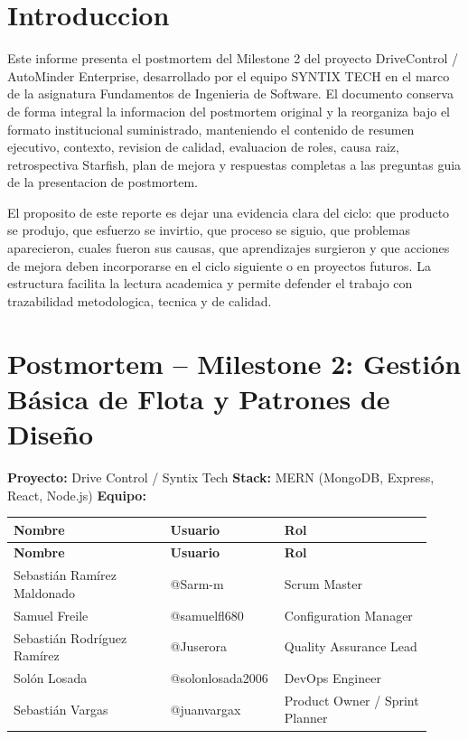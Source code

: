 \documentclass[11pt,a4paper]{article}
\begin{document}
\clearpage
{}
\tableofcontents
\clearpage

\clearpage
\section{Introduccion}

Este informe presenta el postmortem del Milestone 2 del proyecto DriveControl / AutoMinder Enterprise, desarrollado por el equipo SYNTIX TECH en el marco de la asignatura Fundamentos de Ingenieria de Software. El documento conserva de forma integral la informacion del postmortem original y la reorganiza bajo el formato institucional suministrado, manteniendo el contenido de resumen ejecutivo, contexto, revision de calidad, evaluacion de roles, causa raiz, retrospectiva Starfish, plan de mejora y respuestas completas a las preguntas guia de la presentacion de postmortem.

El proposito de este reporte es dejar una evidencia clara del ciclo: que producto se produjo, que esfuerzo se invirtio, que proceso se siguio, que problemas aparecieron, cuales fueron sus causas, que aprendizajes surgieron y que acciones de mejora deben incorporarse en el ciclo siguiente o en proyectos futuros. La estructura facilita la lectura academica y permite defender el trabajo con trazabilidad metodologica, tecnica y de calidad.

\clearpage
\section{Postmortem -- Milestone 2: Gestión Básica de Flota y Patrones de Diseño}
\textbf{Proyecto:} Drive Control / Syntix Tech
\textbf{Stack:} MERN (MongoDB, Express, React, Node.js)
\textbf{Equipo:}

\begingroup
\scriptsize
\setlength{\tabcolsep}{3pt}
\begin{longtable}{P{0.36\linewidth}P{0.22\linewidth}P{0.34\linewidth}}
\toprule
\textbf{Nombre} & \textbf{Usuario} & \textbf{Rol} \\
\midrule
\endfirsthead
\toprule
\textbf{Nombre} & \textbf{Usuario} & \textbf{Rol} \\
\midrule
\endhead
\bottomrule
\endlastfoot
Sebastián Ramírez Maldonado & @Sarm-m & Scrum Master \\
Samuel Freile & @samuelfl680 & Configuration Manager \\
Sebastián Rodríguez Ramírez & @Juserora & Quality Assurance Lead \\
Solón Losada & @solonlosada2006 & DevOps Engineer \\
Sebastián Vargas & @juanvargax & Product Owner / Sprint Planner \\
\end{longtable}
\endgroup
\end{document}
